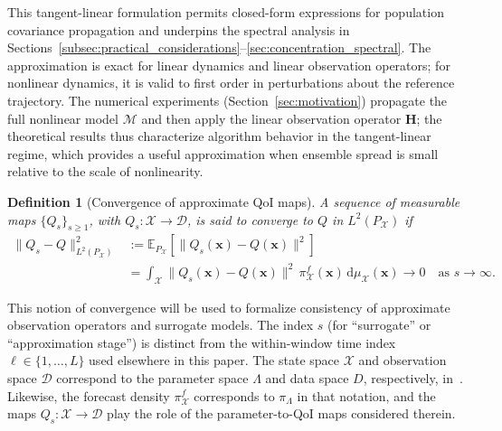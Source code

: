 \documentclass[11pt,a4paper]{article}
\newtheorem{definition}{Definition}
\begin{document}
This tangent-linear formulation permits closed-form expressions for population covariance propagation and underpins the spectral analysis in Sections~\ref{subsec:practical_considerations}--\ref{sec:concentration_spectral}. The approximation is exact for linear dynamics and linear observation operators; for nonlinear dynamics, it is valid to first order in perturbations about the reference trajectory. The numerical experiments (Section~\ref{sec:motivation}) propagate the full nonlinear model $\mathcal{M}$ and then apply the linear observation operator $\mathbf{H}$; the theoretical results thus characterize algorithm behavior in the tangent-linear regime, which provides a useful approximation when ensemble spread is small relative to the scale of nonlinearity.
\begin{definition}[Convergence of approximate QoI maps]
\label{def:map_convergence}
A sequence of measurable maps $\{Q_s\}_{s\ge 1}$, with $Q_s:\mathcal{X}\to\mathcal{D}$, is said to converge to $Q$ in $L^2(P_{\mathcal{X}})$ if
\begin{align*}
\|Q_s-Q\|_{L^2(P_{\mathcal{X}})}^2
&:=
\mathbb{E}_{P_{\mathcal{X}}}\!\left[\|Q_s(\mathbf{x})-Q(\mathbf{x})\|^2\right]\\
&=
\int_{\mathcal{X}}\|Q_s(\mathbf{x})-Q(\mathbf{x})\|^2\,
\pi_{\mathcal{X}}^{f}(\mathbf{x})\,\mathrm{d}\mu_{\mathcal{X}}(\mathbf{x})
\longrightarrow 0
\quad\text{as } s\to\infty.
\end{align*}
\end{definition}
This notion of convergence will be used to formalize consistency of approximate observation operators and surrogate models. The index $s$ (for ``surrogate'' or ``approximation stage'') is distinct from the within-window time index $\ell\in\{1,\ldots,L\}$ used elsewhere in this paper.
The state space $\mathcal{X}$ and observation space $\mathcal{D}$ correspond to the parameter space $\Lambda$ and data space $D$, respectively, in~\cite{ButlerWildeyZhang2020}. Likewise, the forecast density $\pi_{\mathcal{X}}^{f}$ corresponds to $\pi_{\Lambda}$ in that notation, and the maps $Q_s:\mathcal{X}\to\mathcal{D}$ play the role of the parameter-to-QoI maps considered therein.





\end{document}
